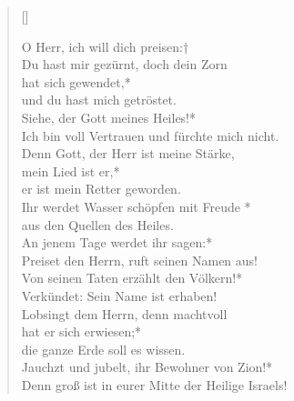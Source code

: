 \begin{verse}[\versewidth]
 
O Herr, ich will dich preisen:†\\
Du hast mir gezürnt, doch dein Zorn\\ hat sich gewendet,*\\
und du hast mich getröstet.\\
\vin Siehe, der Gott meines Heiles!*\\
\vin Ich bin voll Vertrauen und fürchte mich nicht.\\
Denn Gott, der Herr ist meine Stärke,\\
mein Lied ist er,*\\
er ist mein Retter geworden.\\

\vin Ihr werdet Wasser schöpfen mit Freude *\\
\vin aus den Quellen des Heiles.\\

An jenem Tage werdet ihr sagen:*\\
Preiset den Herrn, ruft seinen Namen aus!\\

\vin Von seinen Taten erzählt den Völkern!*\\
\vin Verkündet: Sein Name ist erhaben!\\

Lobsingt dem Herrn, denn machtvoll \\ hat er sich erwiesen;*\\
die ganze Erde soll es wissen.\\

\vin Jauchzt und jubelt, ihr Bewohner von Zion!*\\
\vin Denn groß ist in eurer Mitte der Heilige Israels!\\
\end{verse}

\vspace{0.6cm}

\vspace{0.6cm}

\def\greinitialformat#1{{\fontsize{40}{40}\selectfont #1}}
\gresetfirstlineaboveinitial{\small \textcolor{red}{Ps 89 (90)}}{}
\setaboveinitialseparation{0.72mm}


